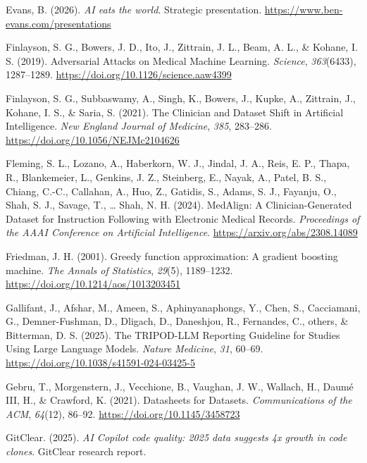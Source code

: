 \documentclass[
  letterpaper,
  11pt]{scrbook}
\newlength{\cslhangindent}
\newenvironment{CSLReferences}[2] %
 {\begin{list}{}{%
  \setlength{\itemindent}{0pt}
  \setlength{\leftmargin}{0pt}
  \setlength{\parsep}{0pt}
  \ifodd #1
   \setlength{\leftmargin}{\cslhangindent}
   \setlength{\itemindent}{-1\cslhangindent}
  \fi
  \setlength{\itemsep}{#2\baselineskip}}}
 {\end{list}}
\begin{document}
\begin{CSLReferences}{1}{0}
Evans, B. (2026). \emph{{AI} eats the world}. Strategic presentation.
\url{https://www.ben-evans.com/presentations}

Finlayson, S. G., Bowers, J. D., Ito, J., Zittrain, J. L., Beam, A. L.,
\& Kohane, I. S. (2019). {Adversarial Attacks on Medical Machine
Learning}. \emph{Science}, \emph{363}(6433), 1287--1289.
\url{https://doi.org/10.1126/science.aaw4399}

Finlayson, S. G., Subbaswamy, A., Singh, K., Bowers, J., Kupke, A.,
Zittrain, J., Kohane, I. S., \& Saria, S. (2021). {The Clinician and
Dataset Shift in Artificial Intelligence}. \emph{New England Journal of
Medicine}, \emph{385}, 283--286.
\url{https://doi.org/10.1056/NEJMc2104626}

Fleming, S. L., Lozano, A., Haberkorn, W. J., Jindal, J. A., Reis, E.
P., Thapa, R., Blankemeier, L., Genkins, J. Z., Steinberg, E., Nayak,
A., Patel, B. S., Chiang, C.-C., Callahan, A., Huo, Z., Gatidis, S.,
Adams, S. J., Fayanju, O., Shah, S. J., Savage, T., \ldots{} Shah, N. H.
(2024). {MedAlign}: {A Clinician-Generated Dataset for Instruction
Following with Electronic Medical Records}. \emph{Proceedings of the
AAAI Conference on Artificial Intelligence}.
\url{https://arxiv.org/abs/2308.14089}

Friedman, J. H. (2001). Greedy function approximation: A gradient
boosting machine. \emph{The Annals of Statistics}, \emph{29}(5),
1189--1232. \url{https://doi.org/10.1214/aos/1013203451}

{Gallifant, J., Afshar, M., Ameen, S., Aphinyanaphongs, Y., Chen, S.,
Cacciamani, G., Demner-Fushman, D., Dligach, D., Daneshjou, R.,
Fernandes, C., others, \& Bitterman, D. S.} (2025). {The TRIPOD-LLM
Reporting Guideline for Studies Using Large Language Models}.
\emph{Nature Medicine}, \emph{31}, 60--69.
\url{https://doi.org/10.1038/s41591-024-03425-5}

Gebru, T., Morgenstern, J., Vecchione, B., Vaughan, J. W., Wallach, H.,
Daumé III, H., \& Crawford, K. (2021). {Datasheets for Datasets}.
\emph{Communications of the ACM}, \emph{64}(12), 86--92.
\url{https://doi.org/10.1145/3458723}

GitClear. (2025). \emph{{AI Copilot} code quality: 2025 data suggests 4x
growth in code clones}. GitClear research report.


\end{CSLReferences}
\end{document}
